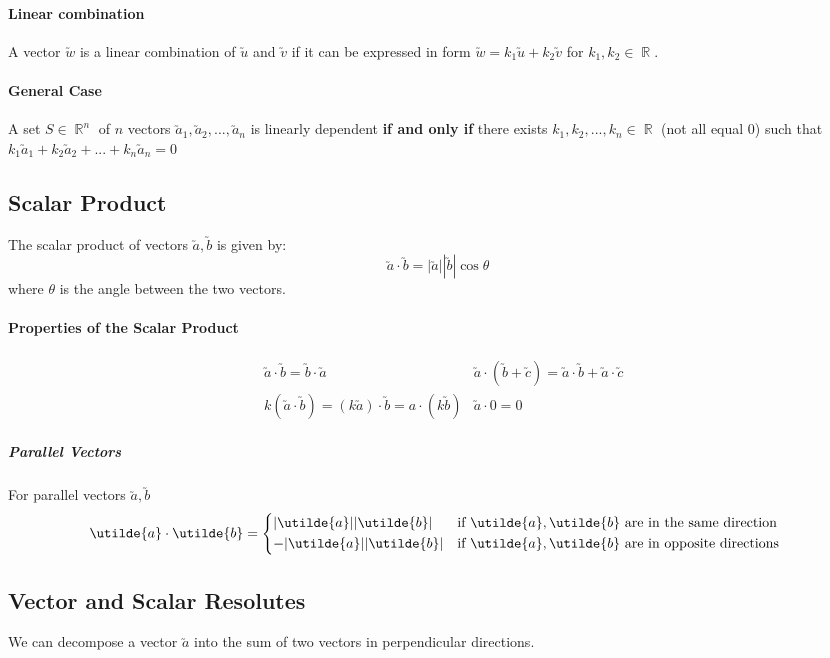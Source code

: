 \documentclass[a4paper,twoside,10pt]{article}
\DeclareMathOperator\R{\mathbb{R}}
\begin{document}
			\paragraph{Linear combination} A vector $\utilde{w}$ is a linear combination of $\utilde{u}$ and $\utilde{v}$ if it can be expressed in form $\utilde{w}=k_1\utilde{u}+k_2\utilde{v}$ for $k_1,k_2\in\R$.
			\paragraph{General Case} A set $S\in\R^n$ of $n$ vectors $\utilde{a}_1,\utilde{a}_2,...,\utilde{a}_n$ is linearly dependent \textbf{if and only if} there exists $k_1,k_2,...,k_n\in\R$ (not all equal 0) such that $k_1\utilde{a}_1+k_2\utilde{a}_2+...+k_n\utilde{a}_n=0$
		\subsection{Scalar Product}
			The scalar product of vectors $\utilde{a},\utilde{b}$ is given by:
			\[
			\utilde{a}\cdot\utilde{b}=|\utilde{a}||\utilde{b}|\cos\theta
			\]
			where $\theta$ is the angle between the two vectors.
			\paragraph{Properties of the Scalar Product}
			\begin{align*}
				&\utilde{a}\cdot\utilde{b}=\utilde{b}\cdot\utilde{a} &\utilde{a}\cdot\left(\utilde{b}+\utilde{c}\right)=\utilde{a}\cdot\utilde{b}+\utilde{a}\cdot\utilde{c} \\
				&k\left(\utilde{a}\cdot\utilde{b}\right)=\left(k\utilde{a}\right)\cdot\utilde{b}=a\cdot\left(k\utilde{b}\right) &\utilde{a}\cdot0=0
			\end{align*}
				\subparagraph{Parallel Vectors} For parallel vectors $\utilde{a},\utilde{b}$
				\[
					\utilde{a}\cdot\utilde{b}=\begin{cases*}
						|\utilde{a}||\utilde{b}| & if $\utilde{a},\utilde{b}$ are in the same direction \\
						-|\utilde{a}||\utilde{b}| & if $\utilde{a},\utilde{b}$ are in opposite directions
					\end{cases*}
				\]
		\subsection{Vector and Scalar Resolutes}
			We can decompose a vector $\utilde{a}$ into the sum of two vectors in perpendicular directions.
\end{document}
